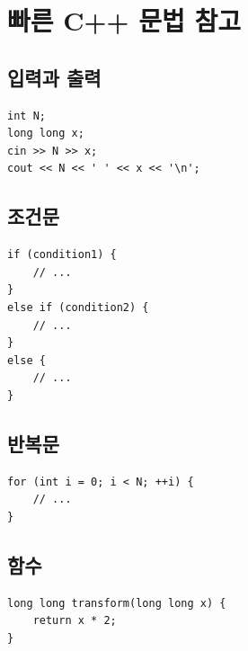 \chapter{빠른 C++ 문법 참고}

\section{입력과 출력}
\begin{lstlisting}
int N;
long long x;
cin >> N >> x;
cout << N << ' ' << x << '\n';
\end{lstlisting}

\section{조건문}
\begin{lstlisting}
if (condition1) {
    // ...
}
else if (condition2) {
    // ...
}
else {
    // ...
}
\end{lstlisting}

\section{반복문}
\begin{lstlisting}
for (int i = 0; i < N; ++i) {
    // ...
}
\end{lstlisting}

\section{함수}
\begin{lstlisting}
long long transform(long long x) {
    return x * 2;
}
\end{lstlisting}


